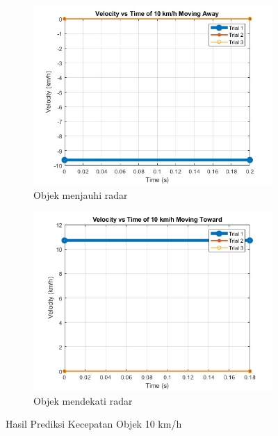 \begin{figure}
    \centering
    \begin{subfigure}[b]{0.45\textwidth}
        \centering
		\includegraphics[scale=0.4]{pics/bab5/Velocity/10MA.jpg}
		\caption{Objek menjauhi radar}
		\label{fig:pengambilan10MA}
    \end{subfigure}
    \hfill
    \begin{subfigure}[b]{0.45\textwidth}
        \centering
		\includegraphics[scale=0.4]{pics/bab5/Velocity/10MT.jpg}
		\caption{Objek mendekati radar}
		\label{fig:pengambilan10MT}
    \end{subfigure}
    \caption{Hasil Prediksi Kecepatan Objek 10 km/h}
    \label{fig:pengambilan10}
\end{figure}

